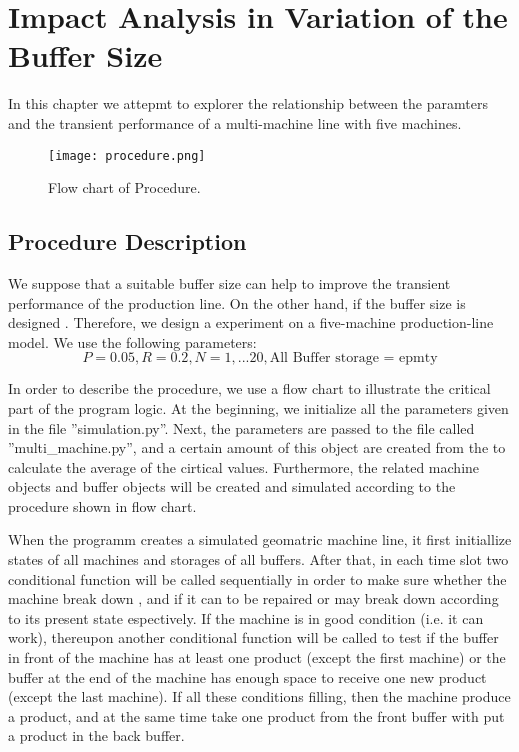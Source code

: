 \chapter{Impact Analysis in Variation of the Buffer Size}
\label{D_Kapitel}
\noindent In this chapter we attepmt to explorer the relationship between the  paramters and the transient performance of a multi-machine line with five machines. 

\begin{figure*}[!h]
    \centering
		\texttt{[image: procedure.png]}	
	\caption{Flow chart of Procedure.}
    \label{flow chart}
\end{figure*}
\section{Procedure Description}
\noindent We suppose that a suitable buffer size can help to improve the transient performance of the production line. On the other hand, if the buffer size is designed . Therefore, we design a experiment on a five-machine production-line model. We use the following parameters:
\begin{displaymath}
    P = 0.05, R = 0.2, N = 1,...20, \text{All Buffer storage = epmty}
\end{displaymath}

In order to describe the procedure, we use a flow chart to illustrate the critical part of the program logic. At the beginning, we initialize all the parameters given in the file ''simulation.py''. Next, the parameters are passed to the file called ''multi\_machine.py'', and a certain amount of this object are created from the  to calculate the average of the cirtical values. Furthermore, the related machine objects and buffer objects will be created and simulated according to the procedure shown in flow chart. 

When the programm creates a simulated geomatric machine line, it first initiallize states of all machines and storages of all buffers. After that, in each time slot two conditional function will be called sequentially in order to make sure whether the machine break down , and if it can to be repaired or may break down according to its present state espectively. If the machine is in good condition (i.e. it can work), thereupon another conditional function will be called to test if the buffer in front of the machine has at least one product (except the first machine) or the buffer at the end of the machine has enough space to receive one new product (except the last machine). If all these conditions filling, then the machine produce a product, and at the same time take one product from the front buffer with put a product in the back buffer.

